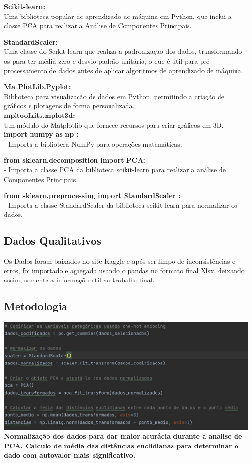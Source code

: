 \documentclass[12pt, a4paper]{article}
\begin{document}
\textbf{Scikit-learn:}\\
Uma biblioteca popular de aprendizado de máquina em Python, que inclui a classe PCA para realizar a Análise de Componentes Principais.

\textbf{StandardScaler:}\\
Uma classe do Scikit-learn que realiza a padronização dos dados, transformando-os para ter média zero e desvio padrão unitário, o que é útil para pré-processamento de dados antes de aplicar algoritmos de aprendizado de máquina.

\textbf{MatPlotLib.Pyplot:}\\
Biblioteca para visualização de dados em Python, permitindo a criação de gráficos e plotagens de forma personalizada.\\
\textbf{mpltoolkits.mplot3d:}\\Um módulo do Matplotlib que fornece recursos para criar gráficos em 3D.\\


\textbf{import numpy as np :}\\- Importa a biblioteca NumPy para operações 
matemáticas.

\textbf{from sklearn.decomposition import PCA:}\\  - Importa a classe PCA da 
biblioteca scikit-learn para realizar a análise de Componentes Principais.

\textbf{from sklearn.preprocessing import StandardScaler :}\\ - Importa a 
classe StandardScaler da biblioteca scikit-learn para normalizar os dados.


\subsection{Dados Qualitativos}
Os Dados foram baixados no site Kaggle e após ser limpo de inconsistências e erros, foi importado e agregado usando o pandas no formato final Xlsx, deixando assim, somente a informação util ao trabalho final.


\subsection{Metodologia}

\begin{center}
    \includegraphics[width=14cm]{figura2}
 \textbf{Normalização dos dados para dar maior acurácia durante a analise de PCA. Calculo de média das distâncias euclidianas para determinar o dado com autovalor mais significativo.}  
\end{center}
\end{document}

